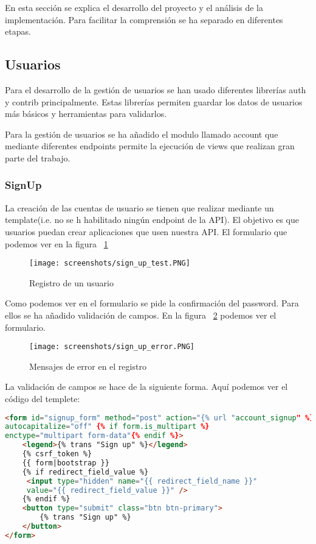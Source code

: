 En esta sección se explica el desarrollo del proyecto y el análisis de la implementación. Para facilitar la comprensión se ha separado en diferentes etapas.

\subsection{Usuarios}
Para el desarrollo de la gestión de usuarios se han usado diferentes librerías auth y contrib principalmente. Estas librerías permiten guardar los datos de usuarios más básicos y herramientas para validarlos.

Para la gestión de usuarios se ha añadido el modulo llamado account que mediante diferentes endpoints permite la ejecución de views que realizan gran parte del trabajo.
\subsubsection{SignUp}
La creación de las cuentas de usuario se tienen que realizar mediante un template(i.e. no se h habilitado ningún endpoint de la API). El objetivo es que usuarios puedan crear aplicaciones que usen nuestra API. El formulario que podemos ver en la figura ~\ref{fig:sign_up_test}

\begin{figure}[ht!]
\center
\texttt{[image: screenshots/sign\_up\_test.PNG]}
\caption{Registro de un usuario}
\label{fig:sign_up_test}
\end{figure}

Como podemos ver en el formulario se pide la confirmación del password. Para ellos se ha añadido validación de campos. En la figura ~\ref{fig:sign_up_error} podemos ver el formulario. 
\begin{figure}[ht!]
\center
\texttt{[image: screenshots/sign\_up\_error.PNG]}
\caption{Mensajes de error en el registro}
\label{fig:sign_up_error}
\end{figure}

La validación de campos se hace de la siguiente forma.
\newpage
Aquí podemos ver el código del templete:
\begin{lstlisting}[language=HTML]
<form id="signup_form" method="post" action="{% url "account_signup" %}" 
autocapitalize="off" {% if form.is_multipart %}
enctype="multipart form-data"{% endif %}>
	<legend>{% trans "Sign up" %}</legend>
	{% csrf_token %}
	{{ form|bootstrap }}
	{% if redirect_field_value %}
	 <input type="hidden" name="{{ redirect_field_name }}"
	 value="{{ redirect_field_value }}" />
	{% endif %}
	<button type="submit" class="btn btn-primary">
		{% trans "Sign up" %}
	</button>
</form>
\end{lstlisting}


